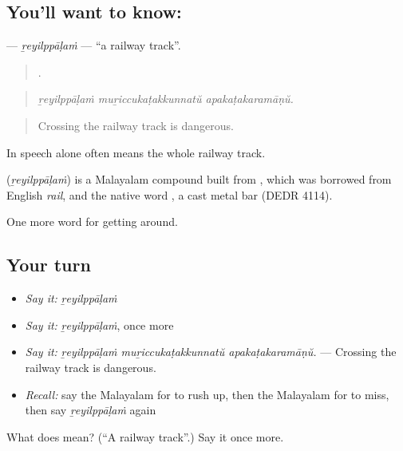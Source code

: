 \subsection*{You'll want to know: }
\textbf{} — \emph{ṟeyilppāḷaṁ} — \textquotedblleft{}a railway track\textquotedblright{}.

\begin{quote}
  .
\end{quote}

\begin{quote}
\emph{ṟeyilppāḷaṁ muṟiccukaṭakkunnatŭ apakaṭakaramāṇŭ.}
\end{quote}

\begin{quote}
Crossing the railway track is dangerous.
\end{quote}

In speech  alone often means the whole railway track.

\begin{cousinweb}
\textbf{} (\emph{ṟeyilppāḷaṁ}) is a Malayalam compound built from , which was borrowed from English \emph{rail}, and the native word , a cast metal bar (DEDR 4114).
\end{cousinweb}

\begin{grammarlens}[title={What you've built}]
One more word for getting around.
\end{grammarlens}

\subsection*{Your turn}
\begin{itemize}
\raggedright
  \item \emph{Say it:} \emph{ṟeyilppāḷaṁ}
  \item \emph{Say it:} \emph{ṟeyilppāḷaṁ}, once more
  \item \emph{Say it:} \emph{ṟeyilppāḷaṁ muṟiccukaṭakkunnatŭ apakaṭakaramāṇŭ.} — Crossing the railway track is dangerous.
  \item \emph{Recall:} say the Malayalam for to rush up, then the Malayalam for to miss, then say \emph{ṟeyilppāḷaṁ} again
\end{itemize}

\begin{tcolorbox}[breakable,colback=teal!4,colframe=teal!35!black,title={Before you move on}]
What does  mean? (\textquotedblleft{}A railway track\textquotedblright{}.) Say it once more.
\end{tcolorbox}
